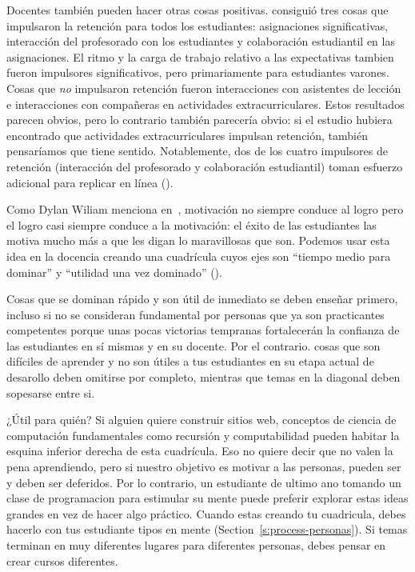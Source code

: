 Docentes también pueden hacer otras cosas positivas.
\cite{Bark2014} consiguió tres cosas que impulsaron la retención para todos los estudiantes:
asignaciones significativas,
interacción del profesorado con los estudiantes
y colaboración estudiantil en las asignaciones.
El ritmo y la carga de trabajo relativo a las expectativas tambien fueron impulsores significativos,
pero primariamente para estudiantes varones.
Cosas que \emph{no} impulsaron retención
fueron interacciones con asistentes de lección
e interacciones con compañeras en actividades extracurriculares.
Estos resultados parecen obvios,
pero lo contrario también parecería obvio:
si el estudio hubiera encontrado que actividades extracurriculares impulsan retención,
también pensaríamos que tiene sentido.
Notablemente,
dos de los cuatro impulsores de retención (interacción del profesorado y colaboración estudiantil)
toman esfuerzo adicional para replicar en línea ().


Como Dylan Wiliam menciona en~\cite{Hend2017},
motivación no siempre conduce al logro 
pero el logro casi siempre conduce a la motivación:
el éxito de las estudiantes las motiva mucho más a que les digan lo maravillosas que son.
Podemos usar esta idea en la docencia
creando una cuadrícula cuyos ejes son ``tiempo medio para dominar''
y ``utilidad una vez dominado'' ().


Cosas que se dominan rápido y son útil de inmediato se deben enseñar primero,
incluso si no se consideran fundamental por personas que ya son practicantes competentes
porque unas pocas victorias tempranas fortalecerán la confianza de las estudiantes en sí mismas y en su docente.
Por el contrario.
cosas que son difíciles de aprender y no son útiles a tus estudiantes en su etapa actual de desarollo
deben omitirse por completo,
mientras que temas en la diagonal deben sopesarse entre si.

\newpage
\begin{aside}{¿Útil para quién?}
  Si alguien quiere construir sitios web,
  conceptos de ciencia de computación fundamentales como recursión y computabilidad
  pueden habitar la esquina inferior derecha de esta cuadrícula. 
  Eso no quiere decir que no valen la pena aprendiendo,
  pero si nuestro objetivo es motivar a las personas,
  pueden ser y deben ser deferidos.
  Por lo contrario,
  un estudiante de ultimo ano tomando un clase de programacion para estimular su mente
  puede preferir explorar estas ideas grandes en vez de hacer algo práctico.
  Cuando estas creando tu cuadricula,
  debes hacerlo con tus estudiante tipos en mente
  (Section~\ref{s:process-personas}).
  Si temas terminan en muy diferentes lugares para diferentes personas,
  debes pensar en crear cursos diferentes.
\end{aside}

